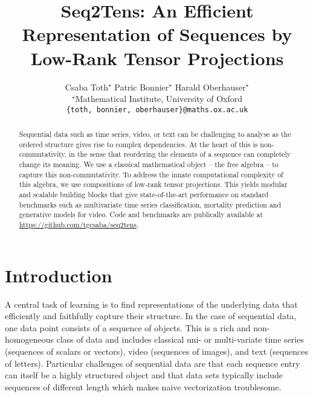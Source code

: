 \documentclass{article} \usepackage{iclr2021_conference,times}
\title{Seq2Tens: An Efficient Representation of Sequences by Low-Rank Tensor Projections}
\author{Csaba Toth$ ^\star $ \And
  Patric Bonnier$ ^\star $ \And 
  Harald Oberhauser$ ^\star $ \And \\[-12pt]
  $ ^\star $Mathematical Institute, University of Oxford \\
  \texttt{\{toth, bonnier, oberhauser\}@\hspace{0.1pt}maths.ox.ac.uk}
}
\theoremstyle{plain}
\theoremstyle{definition}
\begin{document}
\maketitle

\begin{abstract}
  Sequential data such as time series, video, or text can be challenging to analyse as the ordered structure gives rise to complex dependencies. 
  At the heart of this is non-commutativity, in the sense that reordering the elements of a sequence can completely change its meaning.  
  We use a classical mathematical object -- the free algebra -- to capture this non-commutativity. 
  To address the innate computational complexity of this algebra, we use compositions of low-rank tensor projections.
  This yields modular and scalable building blocks that give state-of-the-art performance on standard benchmarks such as multivariate time series classification, mortality prediction and generative models for video. Code and benchmarks are publically available at \url{https://github.com/tgcsaba/seq2tens}.
\end{abstract}
\section{Introduction}
A central task of learning is to find representations of the underlying data that efficiently and faithfully capture their structure.
In the case of sequential data, one data point consists of a sequence of objects.
This is a rich and non-homogeneous class of data and includes classical uni- or multi-variate time series (sequences of scalars or vectors), video (sequences of images), and text (sequences of letters). 
Particular challenges of sequential data are that each sequence entry can itself be a highly structured object and that data sets typically include sequences of different length which makes naive vectorization troublesome.
\end{document}

